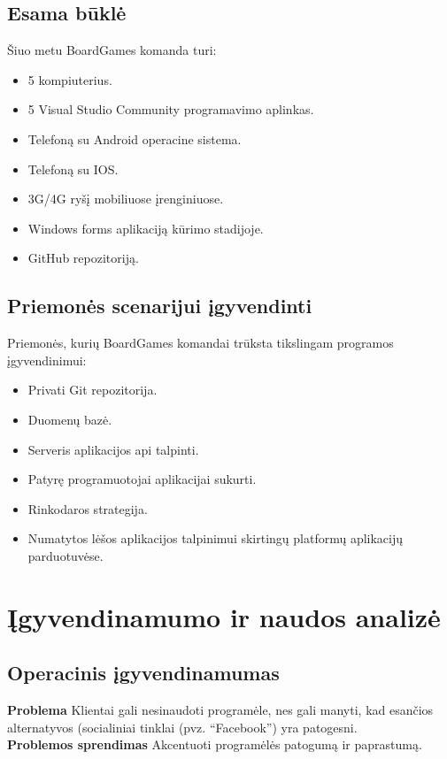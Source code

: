 \documentclass{VUMIFPSkursinis}
\begin{document}
	\subsection {Esama būklė}
	Šiuo metu BoardGames komanda turi:
	\renewcommand{\labelitemi}{$\bullet$}
		\begin{itemize}
			\item 5 kompiuterius.
			\item 5 Visual Studio Community programavimo aplinkas.
			\item Telefoną su Android operacine sistema.
			\item Telefoną su IOS.
			\item 3G/4G ryšį mobiliuose įrenginiuose.
			\item Windows forms aplikaciją kūrimo stadijoje.
			\item GitHub repozitoriją.
		\end{itemize}	

	\subsection {Priemonės scenarijui įgyvendinti}
	Priemonės, kurių BoardGames komandai trūksta tikslingam programos įgyvendinimui:
	\renewcommand{\labelitemi}{$\bullet$}
		\begin{itemize}
			\item Privati Git repozitorija.
			\item Duomenų bazė.
			\item Serveris aplikacijos api talpinti.
			\item Patyrę programuotojai aplikacijai sukurti.
			\item Rinkodaros strategija.
			\item Numatytos lėšos aplikacijos talpinimui skirtingų platformų aplikacijų parduotuvėse.
		\end{itemize}	
\section {Įgyvendinamumo ir naudos analizė}		
	\subsection{Operacinis įgyvendinamumas}
		\noindent \textbf{Problema} Klientai gali nesinaudoti programėle, nes gali manyti, kad esančios alternatyvos (socialiniai tinklai (pvz. “Facebook”) yra patogesni.\\
		\noindent \textbf{Problemos sprendimas} Akcentuoti programėlės patogumą ir paprastumą. \\
\end{document}
